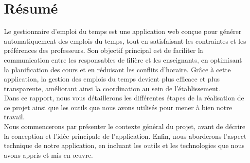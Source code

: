 \chapter*{Résumé}

Le gestionnaire d'emploi du temps est une application web conçue pour générer automatiquement des emplois du temps, tout en satisfaisant les contraintes et les préférences des professeurs. Son objectif principal est de faciliter la communication entre les responsables de filière et les enseignants, en optimisant la planification des cours et en réduisant les conflits d'horaire. Grâce à cette application, la gestion des emplois du temps devient plus efficace et plus transparente, améliorant ainsi la coordination au sein de l'établissement. \\

Dans ce rapport, nous vous détaillerons les différentes étapes
de la réalisation de ce projet ainsi que les outils que nous avons utilisés pour mener à bien notre travail.\\

Nous commencerons par présenter le contexte général du projet, avant de décrire la conception et l’idée principale de l’application. Enfin, nous aborderons l’aspect technique de notre application, en incluant les outils et les technologies que nous avons appris et mis en œuvre.
\newpage
